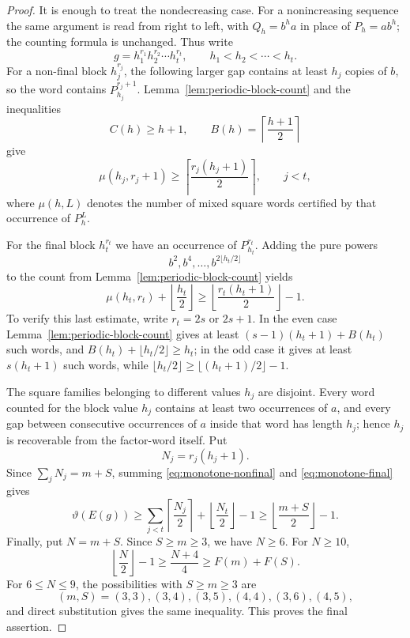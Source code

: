 \documentclass[11pt]{article}
\theoremstyle{definition}
\newcommand{\thetaas}{\vartheta}
\begin{document}
\begin{proof}
It is enough to treat the nondecreasing case.  For a nonincreasing sequence the same argument is read from right to left, with $Q_h=b^ha$ in place of $P_h=ab^h$; the counting formula is unchanged.  Thus write
\[
 g=h_1^{r_1}h_2^{r_2}\cdots h_t^{r_t},
 \qquad h_1<h_2<\cdots<h_t.
\]
For a non-final block $h_j^{r_j}$, the following larger gap contains at least $h_j$ copies of $b$, so the word contains $P_{h_j}^{r_j+1}$.  Lemma~\ref{lem:periodic-block-count} and the inequalities
\[
 C(h)\ge h+1,
 \qquad
 B(h)=\left\lceil\frac{h+1}{2}\right\rceil
\]
give
\begin{equation}\label{eq:monotone-nonfinal}
 \mu(h_j,r_j+1)
 \ge
 \left\lceil\frac{r_j(h_j+1)}2\right\rceil,
 \qquad j<t,
\end{equation}
where $\mu(h,L)$ denotes the number of mixed square words certified by that occurrence of $P_h^L$.

For the final block $h_t^{r_t}$ we have an occurrence of $P_{h_t}^{r_t}$.  Adding the pure powers
\[
 b^2,b^4,\ldots,b^{2\lfloor h_t/2\rfloor}
\]
to the count from Lemma~\ref{lem:periodic-block-count} yields
\begin{equation}\label{eq:monotone-final}
 \mu(h_t,r_t)+\left\lfloor\frac{h_t}{2}\right\rfloor
 \ge
 \left\lfloor\frac{r_t(h_t+1)}2\right\rfloor-1.
\end{equation}
To verify this last estimate, write $r_t=2s$ or $2s+1$.  In the even case Lemma~\ref{lem:periodic-block-count} gives at least $(s-1)(h_t+1)+B(h_t)$ such words, and $B(h_t)+\lfloor h_t/2\rfloor\ge h_t$; in the odd case it gives at least $s(h_t+1)$ such words, while $\lfloor h_t/2\rfloor\ge\lfloor(h_t+1)/2\rfloor-1$.

The square families belonging to different values $h_j$ are disjoint.  Every word counted for the block value $h_j$ contains at least two occurrences of $a$, and every gap between consecutive occurrences of $a$ inside that word has length $h_j$; hence $h_j$ is recoverable from the factor-word itself.  Put
\[
 N_j=r_j(h_j+1).
\]
Since $\sum_jN_j=m+S$, summing \eqref{eq:monotone-nonfinal} and \eqref{eq:monotone-final} gives
\[
 \thetaas(E(g))
 \ge
 \sum_{j<t}\left\lceil\frac{N_j}{2}\right\rceil
 +\left\lfloor\frac{N_t}{2}\right\rfloor-1
 \ge
 \left\lfloor\frac{m+S}{2}\right\rfloor-1.
\]
Finally, put $N=m+S$.  Since $S\ge m\ge3$, we have $N\ge6$.  For $N\ge10$,
\[
 \left\lfloor\frac N2\right\rfloor-1
 \ge \frac{N+4}{4}
 \ge F(m)+F(S).
\]
For $6\le N\le9$, the possibilities with $S\ge m\ge3$ are
\[
 (m,S)=(3,3),(3,4),(3,5),(4,4),(3,6),(4,5),
\]
and direct substitution gives the same inequality.  This proves the final assertion.
\end{proof}
\end{document}
